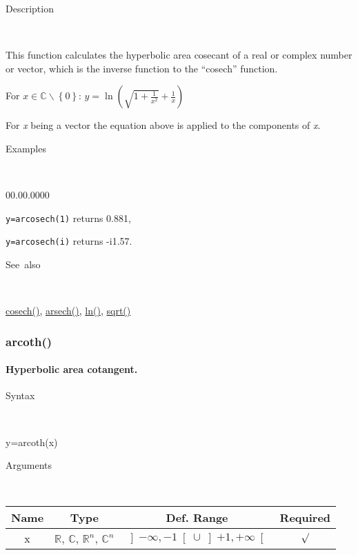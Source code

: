 \begin{description}
\item [Description]~
\end{description}
This function calculates the hyperbolic area cosecant of a real or complex
number or vector, which is the inverse function to the {}``cosech''
function.

\medskip{}
For $x\in\mathbb{C}\backslash \left\lbrace 0\right\rbrace $: $y=\ln\left(\sqrt{1+\frac{1}{x^2}}+\frac{1}{x}\right)$
\medskip{}

For \textit{x} being a vector the equation above is applied
to the components of \textit{x}.

\begin{description}
\item [Examples]~
\end{description}
\begin{lyxlist}{00.00.0000}
\item [\texttt{y=arcosech(1)}]returns 0.881,
\item [\texttt{y=arcosech(i)}]returns -i1.57.
\end{lyxlist}
\begin{description}
\item [See~also]~
\end{description}
\textcolor{blue}{\hyperlink{cosech}{cosech()}}\textcolor{black}{,} \textcolor{blue}{\hyperlink{arsech}{arsech()}}\textcolor{black}{,} 
\textcolor{blue}{\hyperlink{ln}{ln()}}\textcolor{black}{,} \textcolor{blue}{\hyperlink{sqrt}{sqrt()}}


\newpage
\subsubsection*{\hypertarget{arcoth}{}{\Large arcoth()}}


\paragraph{\label{par:Hyperbolic-area-cotangent}Hyperbolic area cotangent.}

\begin{description}
\item [Syntax]~
\end{description}
y=arcoth(x)

\begin{description}
\item [Arguments]~
\end{description}
\begin{tabular}{|c|c|c|c|}
\hline 
Name&
Type&
Def. Range&
Required\tabularnewline
\hline
\hline 
x&
$\mathbb{R}$, $\mathbb{C}$, $\mathbb{R}^{n}$, $\mathbb{C}^{n}$&
$\left]-\infty,-1\right[\cup\left]+1,+\infty\right[$&
$\surd$\tabularnewline
\hline
\end{tabular}

